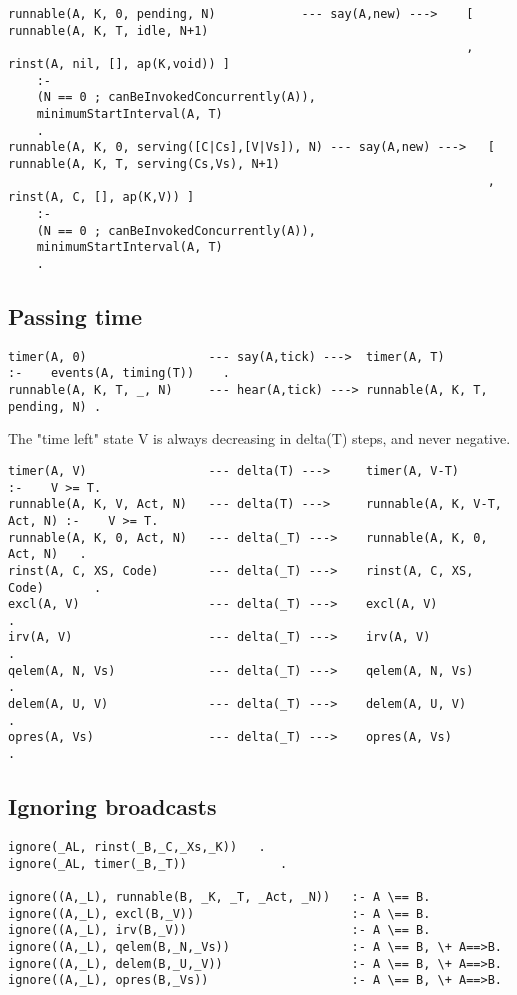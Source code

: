 \begin{verbatim}
runnable(A, K, 0, pending, N)            --- say(A,new) --->    [ runnable(A, K, T, idle, N+1)
                                                                , rinst(A, nil, [], ap(K,void)) ]
    :-
    (N == 0 ; canBeInvokedConcurrently(A)),
    minimumStartInterval(A, T)
    .
runnable(A, K, 0, serving([C|Cs],[V|Vs]), N) --- say(A,new) --->   [ runnable(A, K, T, serving(Cs,Vs), N+1)
                                                                   , rinst(A, C, [], ap(K,V)) ]
    :-
    (N == 0 ; canBeInvokedConcurrently(A)),
    minimumStartInterval(A, T)
    .
\end{verbatim}
\subsection{Passing time}

\begin{verbatim}
timer(A, 0)                 --- say(A,tick) --->  timer(A, T)                :-    events(A, timing(T))    .
runnable(A, K, T, _, N)     --- hear(A,tick) ---> runnable(A, K, T, pending, N) .
\end{verbatim}

The "time left" state V is always decreasing in delta(T) steps, and never negative.
\begin{verbatim}
timer(A, V)                 --- delta(T) --->     timer(A, V-T)               :-    V >= T.
runnable(A, K, V, Act, N)   --- delta(T) --->     runnable(A, K, V-T, Act, N) :-    V >= T.
runnable(A, K, 0, Act, N)   --- delta(_T) --->    runnable(A, K, 0, Act, N)   .
rinst(A, C, XS, Code)       --- delta(_T) --->    rinst(A, C, XS, Code)       .
excl(A, V)                  --- delta(_T) --->    excl(A, V)                  .
irv(A, V)                   --- delta(_T) --->    irv(A, V)                  .
qelem(A, N, Vs)             --- delta(_T) --->    qelem(A, N, Vs)            .
delem(A, U, V)              --- delta(_T) --->    delem(A, U, V)             .
opres(A, Vs)                --- delta(_T) --->    opres(A, Vs)               .
\end{verbatim}


\subsection{Ignoring broadcasts}

\begin{verbatim}
ignore(_AL, rinst(_B,_C,_Xs,_K))   .
ignore(_AL, timer(_B,_T))             .

ignore((A,_L), runnable(B, _K, _T, _Act, _N))   :- A \== B.
ignore((A,_L), excl(B,_V))                      :- A \== B.
ignore((A,_L), irv(B,_V))                       :- A \== B.
ignore((A,_L), qelem(B,_N,_Vs))                 :- A \== B, \+ A==>B.
ignore((A,_L), delem(B,_U,_V))                  :- A \== B, \+ A==>B.
ignore((A,_L), opres(B,_Vs))                    :- A \== B, \+ A==>B.
\end{verbatim}


